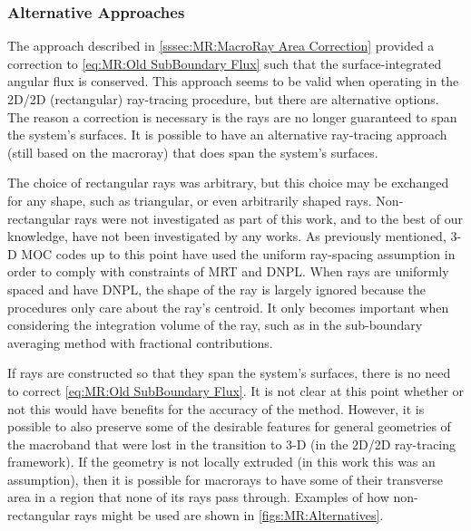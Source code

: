 {{{      \subsubsection{Alternative Approaches}{\label{sssec:MR:Alternative Approaches}
        The approach described in \cref{sssec:MR:MacroRay Area Correction} provided a correction to \cref{eq:MR:Old SubBoundary Flux} such that the surface-integrated angular flux is conserved.
        This approach seems to be valid when operating in the 2D/2D (rectangular) ray-tracing procedure, but there are alternative options.
        The reason a correction is necessary is the rays are no longer guaranteed to span the system's surfaces.
        It is possible to have an alternative ray-tracing approach (still based on the macroray) that does span the system's surfaces.

        The choice of rectangular rays was arbitrary, but this choice may be exchanged for any shape, such as triangular, or even arbitrarily shaped rays.
        Non-rectangular rays were not investigated as part of this work, and to the best of our knowledge, have not been investigated by any works.
        As previously mentioned, 3-D \ac{MOC} codes up to this point have used the uniform ray-spacing assumption in order to comply with constraints of \ac{MRT} and \ac{DNPL}.
        When rays are uniformly spaced and have \ac{DNPL}, the shape of the ray is largely ignored because the procedures only care about the ray's centroid.
        It only becomes important when considering the integration volume of the ray, such as in the sub-boundary averaging method with fractional contributions.

        If rays are constructed so that they span the system's surfaces, there is no need to correct \cref{eq:MR:Old SubBoundary Flux}.
        It is not clear at this point whether or not this would have benefits for the accuracy of the method.
        However, it is possible to also preserve some of the desirable features for general geometries of the macroband that were lost in the transition to 3-D (in the 2D/2D ray-tracing framework).
        If the geometry is not locally extruded (in this work this was an assumption), then it is possible for macrorays to have some of their transverse area in a region that none of its rays pass through.
        Examples of how non-rectangular rays might be used are shown in \cref{figs:MR:Alternatives}.

}}}}
